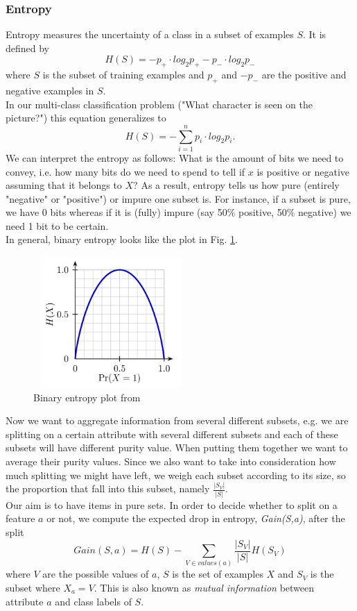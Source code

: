 \documentclass[journal, a4paper]{IEEEtran}
\begin{document}
\subsubsection{Entropy}
Entropy measures the uncertainty of a class in a subset of examples \( S \). It is defined by
\[ H(S) = -p_{+} \cdot log_{2} p_{+} -p_{-} \cdot log_{2} p_{-}   \] where \( S \) is the subset of training examples and \( p_{+} \) and \( -p_{-} \) are the positive and negative examples in \( S \). \\ In our multi-class classification problem ("What character is seen on the picture?") this equation generalizes to 
\[ H(S) = - \sum_{i=1}^{n} p_{i} \cdot log_{2} p_{i}.  \]
We can interpret the entropy as follows: What is the amount of bits we need to convey, i.e. how many bits do we need to spend to tell if \( x \) is positive or negative assuming that it belongs to \( X \)? As a result, entropy tells us how pure (entirely "negative" or "positive") or impure one subset is. For instance, if a subset is pure, we have 0 bits whereas if it is (fully) impure (say 50\% positive, 50\% negative) we need 1 bit to be certain.\\
In general, binary entropy looks like the plot in Fig. \ref{entropy}. 

\begin{figure}[!ht]
	\centering
  \includegraphics[width=6cm, height=5cm]{Binary_entropy_plot.png}
	\caption{Binary entropy plot from \cite{entropy}}
    \label{entropy}
\end{figure}
Now we want to aggregate information from several  different subsets, e.g. we are splitting on a certain attribute with several different subsets and each of these subsets will have different purity value. When putting them together we want to average their purity values. Since we also want to take into consideration how much splitting we might have left, we weigh each subset according to its size, so the proportion that fall into this subset, namely \( \frac{|S_{V}|}{|S|}\).\\
Our aim is to have items in pure sets. In order to decide whether to split on a feature \( a \) or not, we compute the expected drop in entropy, \textit{Gain(S,a)}, after the split 
\[ Gain(S,a) = H(S) - \sum_{V \in values(a)} \frac{|S_{V}|}{|S|} H(S_V) \]
where \( V \) are the possible values of \( a \), \( S \) is the set of examples \( {X} \) and \( S_{V} \) is the subset where \( X_{a} = V \). This is also known as \textit{mutual information} between attribute \( a \) and class labels of \( S \).
\end{document}
